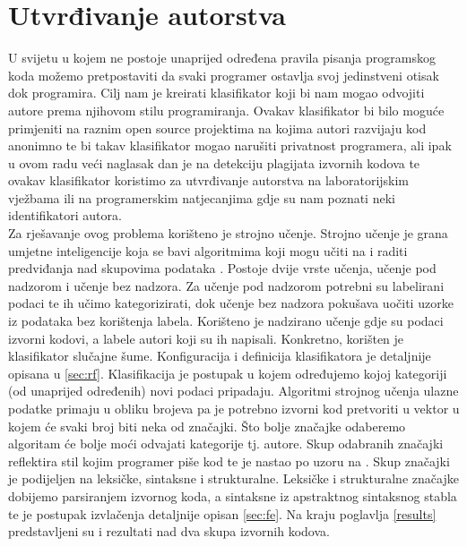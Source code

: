 \chapter{Utvrđivanje autorstva}
U svijetu u kojem ne postoje unaprijed određena pravila pisanja programskog koda možemo pretpostaviti da svaki programer ostavlja svoj jedinstveni otisak dok programira. Cilj nam je kreirati klasifikator koji bi nam mogao odvojiti autore prema njihovom stilu programiranja. Ovakav klasifikator bi bilo moguće primjeniti na raznim open source projektima na kojima autori razvijaju kod anonimno te bi takav klasifikator mogao narušiti privatnost programera, ali ipak u ovom radu veći naglasak dan je na detekciju plagijata izvornih kodova te ovakav klasifikator koristimo za utvrđivanje autorstva na laboratorijskim vježbama ili na programerskim natjecanjima gdje su nam poznati neki identifikatori autora. \\

	Za rješavanje ovog problema korišteno je strojno učenje. Strojno učenje je grana umjetne inteligencije koja se bavi algoritmima koji mogu učiti na i raditi predviđanja nad skupovima podataka \cite{ml-def}. Postoje dvije vrste učenja, učenje pod nadzorom i učenje bez nadzora. Za učenje pod nadzorom potrebni su labelirani podaci te ih učimo kategorizirati, dok učenje bez nadzora pokušava uočiti uzorke iz podataka bez korištenja labela. Korišteno je nadzirano učenje gdje su podaci izvorni kodovi, a labele autori koji su ih napisali.  Konkretno, korišten je klasifikator slučajne šume. Konfiguracija i definicija klasifikatora je detaljnije opisana u \ref{sec:rf}. Klasifikacija je postupak u kojem određujemo kojoj kategoriji (od unaprijed određenih) novi podaci pripadaju. Algoritmi strojnog učenja ulazne podatke primaju u obliku brojeva pa je potrebno izvorni kod pretvoriti u vektor u kojem će svaki broj biti neka od značajki. Što bolje značajke odaberemo algoritam će bolje moći odvajati kategorije tj. autore. Skup odabranih značajki reflektira stil kojim programer piše kod te je nastao po uzoru na \cite{islam}. Skup značajki je podijeljen na leksičke, sintaksne i strukturalne.  Leksičke i strukturalne značajke dobijemo parsiranjem izvornog koda, a sintaksne iz apstraktnog sintaksnog stabla te je postupak izvlačenja detaljnije opisan \ref{sec:fe}. Na kraju poglavlja \ref{results} predstavljeni su i rezultati nad dva skupa izvornih kodova.

